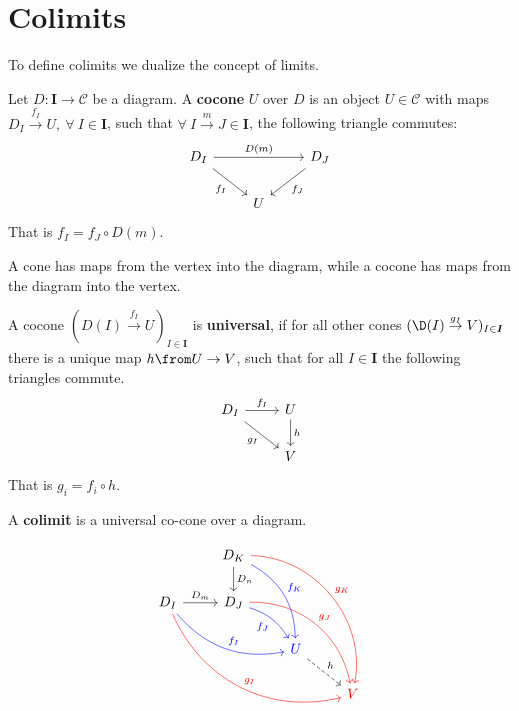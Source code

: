 
\chapter{Colimits}
To define colimits we dualize the concept of limits.
\begin{definition}
  Let $D : \bm I \to \mathscr C$ be a diagram.
  A \textbf{cocone} $U$ over $D$ is an object $U \in \mathscr{C}$
  with maps $D_I \overset{ f_I}{\rightarrow} U,\ \forall\ I \in \bm{I}$, such that
  $\forall\ I \overset{m}{\to} J \in \bm{I}$, the following triangle commutes:
  \[
    \begin{tikzcd}
      D_I \arrow[rr, "D(m)"]\arrow[dr, swap, "f_I"] & & D_J \arrow{dl}{f_J}\\
      & U  &
    \end{tikzcd}
  \]
  That is $f_I = f_J \circ D(m)$.\\
\end{definition}
A cone has maps from the vertex into the diagram,
while a cocone has maps from the diagram into the vertex.
\begin{definition}
  A cocone $(D(I)\overset{f_I}{\to} U)_{I\in \bm{I}}$ is \textbf{universal}, if
  for all other cones $(\D(I) \overset{g_I}{\to} V)_{I\in \bm{I}}$ there is a unique
  map $h \from U \to V$, such that for all $I \in \bm{I}$
  the following triangles commute.
  \[
    \begin{tikzcd}
      D_I \arrow[dr, swap, "g_I"] \arrow{r}{f_I} & U \arrow{d}{h} \\
      & V
    \end{tikzcd}
  \]
  That is $g_i = f_i \circ h$.
\end{definition}

\begin{definition}
  A \textbf{colimit} is a universal co-cone over a diagram.
\end{definition}

\[
    \begin{tikzcd}
      & D_K \arrow{d}{D_n}
      \arrow[bend left=30,color=blue]{ddr}{f_K}
      \arrow[bend left=50,color=red]{dddrr}{g_K} & & \\
      D_I \arrow{r}{D_m}
      \arrow[bend right=30,color=blue]{drr}{f_I}
      \arrow[bend right=40,color=red]{ddrrr}{g_I} &
      D_J \arrow[bend left=20,swap, color=blue]{dr}{f_J}
      \arrow[bend left=40,color=red]{ddrr}{g_J} & & \\
      & & {\color{blue}U} \arrow[dashed]{dr}{h}& \\
      & & & {\color{red}V}
    \end{tikzcd}
\]



